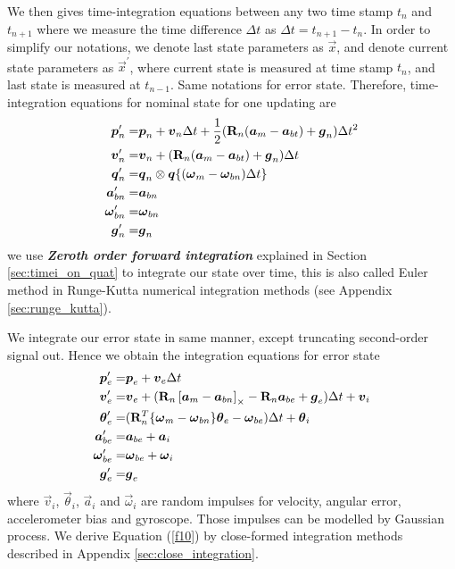 We then gives time-integration equations between any two time stamp $t_n$ and $t_{n+1}$ where we measure the time difference $\Delta{t}$ as $\Delta{t} = t_{n+1} - t_{n}$. In order to simplify our notations, we denote last state parameters as $\vec{x}$, and denote current state parameters as $\vec{x}^{\prime}$, where current state is measured at time stamp $t_{n}$, and last state is measured at $t_{n-1}$. Same notations for error state. Therefore, time-integration equations for nominal state for one updating are
\begin{align}
	\boldsymbol{p}_n^{\prime} =& \boldsymbol{p}_n + \boldsymbol{v}_n\Delta{t} + \frac{1}{2}(\mathbf{R}_n(\boldsymbol{a}_m - \boldsymbol{a}_{bt}) + \boldsymbol{g}_n)\Delta{t}^2 \\
	\boldsymbol{v}_n^{\prime} =& \boldsymbol{v}_n + (\mathbf{R}_n(\boldsymbol{a}_m - \boldsymbol{a}_{bt}) + \boldsymbol{g}_n)\Delta{t}\\
	\label{f9}
	\boldsymbol{q}_n^{\prime} =& \boldsymbol{q}_n \otimes \boldsymbol{q}\{(\boldsymbol{\omega}_m - \boldsymbol{\omega}_{bn})\Delta{t}\}\\
	\boldsymbol{a}_{bn}^{\prime} =& \boldsymbol{a}_{bn} \\
	\boldsymbol{\omega}_{bn}^{\prime} =& \boldsymbol{\omega}_{bn} \\ 
	\boldsymbol{g}_n^{\prime} =& \boldsymbol{g}_n
\end{align}
we use \textbf{\textit{Zeroth order forward integration}} explained in Section \ref{sec:timei_on_quat} to integrate our state over time, this is also called Euler method in Runge-Kutta numerical integration methods (see Appendix \ref{sec:runge_kutta}).

We integrate our error state in same manner, except truncating second-order signal out. Hence we obtain the integration equations for error state
\begin{align}
	\boldsymbol{p}_e^{\prime} =& \boldsymbol{p}_e + \boldsymbol{v}_e \Delta{t}\\
	\boldsymbol{v}_e^{\prime} =& \boldsymbol{v}_e + (\mathbf{R}_n \left[ \boldsymbol{a}_m - \boldsymbol{a}_{bn} \right]_{\times} -  \mathbf{R}_n\boldsymbol{a}_{be} + \boldsymbol{g}_e)\Delta{t} + \boldsymbol{v}_i\\
	\label{f10}
	\boldsymbol{\theta}_e^{\prime} =& (\mathbf{R}_n^T \{ \boldsymbol{\omega}_m - \boldsymbol{\omega}_{bn} \} \boldsymbol{\theta}_e - \boldsymbol{\omega}_{be})\Delta{t} + \boldsymbol{\theta}_{i}\\
	\boldsymbol{a}_{be}^{\prime} =& \boldsymbol{a}_{be} + \boldsymbol{a}_i\\
	\boldsymbol{\omega}_{be}^{\prime} =& \boldsymbol{\omega}_{be} + \boldsymbol{\omega}_i\\ 
	\boldsymbol{g}_e^{\prime} =& \boldsymbol{g}_e
\end{align}
where $\vec{v}_i$, $\vec{\theta}_{i}$, $\vec{a}_i$ and $\vec{\omega}_i$ are random impulses for velocity, angular error, accelerometer bias and gyroscope. Those impulses can be modelled by Gaussian process. We derive Equation (\ref{f10}) by close-formed integration methods described in Appendix \ref{sec:close_integration}.

